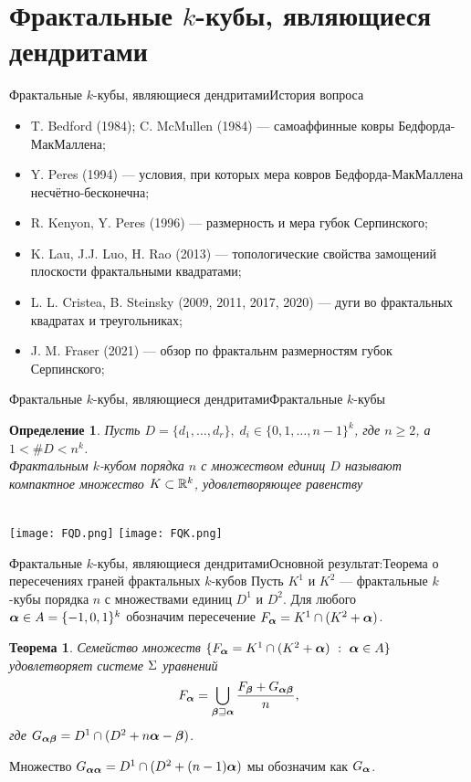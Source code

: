 \documentclass[aspectratio=1610, 10pt, notheorems]{beamer}
\newtheorem{theorem}     {Теорема}
\newtheorem{definition}  {Определение}
\begin{document}
\section{Фрактальные $k$-кубы, являющиеся дендритами}


\begin{frame}{Фрактальные $k$-кубы, являющиеся дендритами}{История вопроса}
\begin{itemize}
    \item T. Bedford (1984); C. McMullen (1984) --- самоаффинные ковры Бедфорда-МакМаллена;
    \item Y. Peres (1994) --- условия, при которых мера ковров Бедфорда-МакМаллена несчётно-бесконечна;
    \item R. Kenyon, Y. Peres (1996) --- размерность и мера губок Серпинского;
    \item K. Lau, J.J. Luo, H. Rao (2013) --- топологические свойства замощений плоскости фрактальными квадратами;
    \item L. L. Cristea, B. Steinsky (2009, 2011, 2017, 2020) --- дуги во фрактальных квадратах и треугольниках;
    \item J. M. Fraser (2021) --- обзор по фрактальнм размерностям губок Серпинского;
\end{itemize}
\end{frame}


\begin{frame}{Фрактальные $k$-кубы, являющиеся дендритами}{Фрактальные $k$-кубы}

\begin{definition}
Пусть  $D=\{d_1,\ldots,d_r\},\; d_i\in\{0,1,\ldots,n-1\}^k$, где $n\ge 2$, а $1<\#D<n^k$.\\
{\em Фрактальным $k$-кубом порядка $n$ с множеством единиц $D$} называют компактное множество $K\subset\mathbb{R}^k$, удовлетворяющее равенству\\
\end{definition}
\;\\
\qquad\qquad
\texttt{[image: FQD.png]}
\hfill
\texttt{[image: FQK.png]}
\qquad\qquad
\end{frame}


\begin{frame}{Фрактальные $k$-кубы, являющиеся дендритами}{Основной результат:Теорема о пересечениях граней фрактальных $k$-кубов }
Пусть $K^1$ и $K^2$ --- фрактальные $k$-кубы порядка $n$ с множествами единиц $D^1$ и $D^2$.
Для любого ${\bm{\alpha}}\in A=\{-1,0,1\}^k$ обозначим пересечение $F_{\bm{\alpha}}=K^1\cap(K^2+{\bm{\alpha}})$.

\begin{theorem}\label{IFC}
Семейство множеств $\{F_{\bm{\alpha}}=K^1\cap(K^2+{\bm{\alpha}})\ :\ {\bm{\alpha}}\in A\}$ удовлетворяет системе $\Sigma$ уравнений 
$$F_{\bm{\alpha}}=\bigcup\limits_{{\bm{\beta}}\sqsupseteq{\bm{\alpha}}} 
\dfrac{F_{\bm{\beta}}+G_{{\bm{\alpha}}{\bm{\beta}}}}{n},$$
где $G_{{\bm{\alpha}}{\bm{\beta}}}=D^1\cap(D^2+n{\bm{\alpha}}-{\bm{\beta}})$.
\end{theorem}
Множество $G_{{\bm{\alpha}}{\bm{\alpha}}}=D^1\cap(D^2+(n-1){\bm{\alpha}})$ мы обозначим как $G_{{\bm{\alpha}}}$.
\end{frame}
\end{document}
